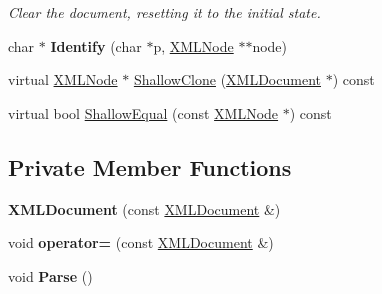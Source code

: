 \begin{DoxyCompactItemize}
\begin{DoxyCompactList}\small\item\em Clear the document, resetting it to the initial state. \end{DoxyCompactList}\item 
\hypertarget{classtinyxml2_1_1_x_m_l_document_af255cf899d2bf5dbae54c9b6de9c2752}{}char $\ast$ {\bfseries Identify} (char $\ast$p, \hyperlink{classtinyxml2_1_1_x_m_l_node}{X\+M\+L\+Node} $\ast$$\ast$node)\label{classtinyxml2_1_1_x_m_l_document_af255cf899d2bf5dbae54c9b6de9c2752}

\item 
virtual \hyperlink{classtinyxml2_1_1_x_m_l_node}{X\+M\+L\+Node} $\ast$ \hyperlink{classtinyxml2_1_1_x_m_l_document_a57c8511ed9f83aa3e20909a3db3f83d0}{Shallow\+Clone} (\hyperlink{classtinyxml2_1_1_x_m_l_document}{X\+M\+L\+Document} $\ast$) const 
\item 
virtual bool \hyperlink{classtinyxml2_1_1_x_m_l_document_a12eac66c6e45d074d5cc47319868cd66}{Shallow\+Equal} (const \hyperlink{classtinyxml2_1_1_x_m_l_node}{X\+M\+L\+Node} $\ast$) const 
\end{DoxyCompactItemize}
\subsection*{Private Member Functions}
\begin{DoxyCompactItemize}
\item 
\hypertarget{classtinyxml2_1_1_x_m_l_document_adcea490db02a099d99440cd14a87d9e4}{}{\bfseries X\+M\+L\+Document} (const \hyperlink{classtinyxml2_1_1_x_m_l_document}{X\+M\+L\+Document} \&)\label{classtinyxml2_1_1_x_m_l_document_adcea490db02a099d99440cd14a87d9e4}

\item 
\hypertarget{classtinyxml2_1_1_x_m_l_document_aa542c2cf1276ee4bd778f16d196fe222}{}void {\bfseries operator=} (const \hyperlink{classtinyxml2_1_1_x_m_l_document}{X\+M\+L\+Document} \&)\label{classtinyxml2_1_1_x_m_l_document_aa542c2cf1276ee4bd778f16d196fe222}

\item 
\hypertarget{classtinyxml2_1_1_x_m_l_document_aeb556e0e2bed02a73a6c5aaf19759e9a}{}void {\bfseries Parse} ()\label{classtinyxml2_1_1_x_m_l_document_aeb556e0e2bed02a73a6c5aaf19759e9a}

\end{DoxyCompactItemize}
